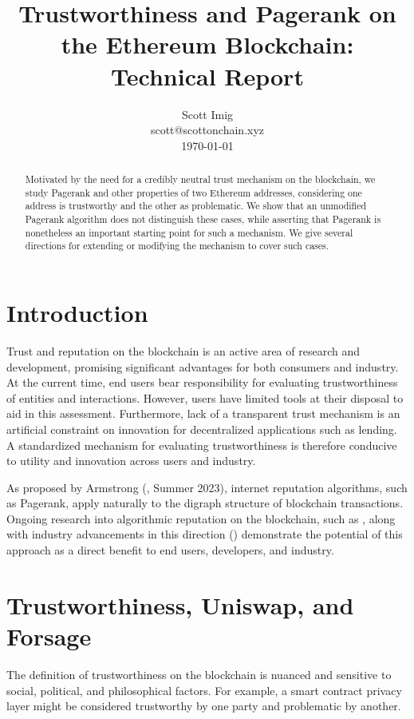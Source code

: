 \documentclass[a4paper]{article}
\title{Trustworthiness and Pagerank on the Ethereum Blockchain: Technical Report}
\author{Scott Imig\\
scott@scottonchain.xyz\\
\today}
\begin{document}
\maketitle

\begin{abstract}
Motivated by the need for a credibly neutral trust mechanism on the blockchain, we study Pagerank and other properties of two Ethereum addresses, considering one address is trustworthy and the other as problematic.  We show that an unmodified Pagerank algorithm does not distinguish these cases, while asserting that Pagerank is nonetheless an important starting point for such a mechanism.  We give several directions for extending or modifying the mechanism to cover such cases.
\end{abstract}



\section{Introduction}

Trust and reputation on the blockchain is an active area of research and development, promising significant advantages for both consumers and industry.  At the current time, end users bear responsibility for evaluating trustworthiness of entities and interactions. However, users have limited tools at their disposal to aid in this assessment. Furthermore, lack of a transparent trust mechanism is an artificial constraint on innovation for decentralized applications such as lending.  A standardized mechanism for evaluating trustworthiness is therefore conducive to utility and innovation across users and industry.

As proposed by Armstrong (\cite{Armstrong}, Summer 2023), internet reputation algorithms, such as Pagerank, apply naturally to the digraph structure of blockchain transactions.  Ongoing research into algorithmic reputation on the blockchain, such as \cite{Paven2}, along with industry advancements in this direction (\cite{Octan}) demonstrate the potential of this approach as a direct benefit to end users, developers, and industry.

\section{Trustworthiness, Uniswap, and Forsage}

The definition of trustworthiness on the blockchain is nuanced and sensitive to social, political, and philosophical factors.  For example, a smart contract privacy layer might be considered trustworthy by one party and problematic by another.  
\end{document}
